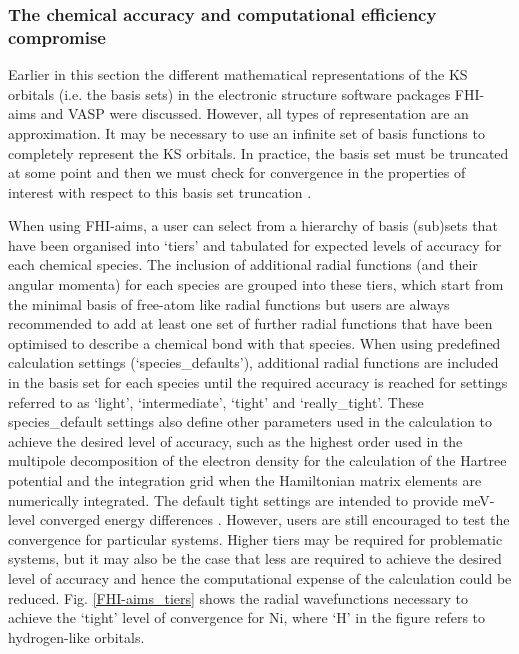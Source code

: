 \documentclass[11pt, twoside]{report}
\begin{document}
\subsubsection{The chemical accuracy and computational efficiency compromise}\label{chem_acc_vs_eff}
Earlier in this section the different mathematical representations of the KS orbitals (i.e. the basis sets) in the electronic structure software packages FHI-aims and VASP were discussed. However, all types of representation are an approximation. It may be necessary to use an infinite set of basis functions to completely represent the KS orbitals. In practice, the basis set must be truncated at some point and then we must check for convergence in the properties of interest with respect to this basis set truncation \cite{Prasad_ch6}. 

When using FHI-aims, a user can select from a hierarchy of basis (sub)sets that have been organised into `tiers' and tabulated for expected levels of accuracy for each chemical species. The inclusion of additional radial functions (and their angular momenta) for each species are grouped into these tiers, which start from the minimal basis of free-atom like radial functions but users are always recommended to add at least one set of further radial functions that have been optimised to describe a chemical bond with that species.  When using predefined calculation settings (`species\_defaults'), additional radial functions are included in the basis set for each species until the required accuracy is reached for settings referred to as `light', `intermediate', `tight' and `really\_tight'. These species\_default settings also define other parameters used in the calculation to achieve the desired level of accuracy, such as the highest order used in the multipole decomposition of the electron density for the calculation of the Hartree potential and the integration grid when the Hamiltonian matrix elements are numerically integrated. The default tight settings are intended to provide meV-level converged energy differences \cite{FHI-aims_manual}. However, users are still encouraged to test the convergence for particular systems. Higher tiers may be required for problematic systems, but it may also be the case that less are required to achieve the desired level of accuracy and hence the computational expense of the calculation could be reduced. Fig. \ref{FHI-aims_tiers} shows the radial wavefunctions necessary to achieve the `tight' level of convergence for Ni, where `H' in the figure refers to hydrogen-like orbitals. 
\end{document}
